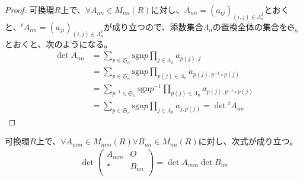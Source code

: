 \documentclass[dvipdfmx]{jsarticle}
\begin{document}
\begin{proof}
可換環$R$上で、$\forall A_{nn} \in M_{nn}(R)$に対し、$A_{nn} = \left( a_{ij} \right)_{(i,j) \in \varLambda_{n}^{2}}$とおくと、$^{t}A_{nn} = \left( a_{ji} \right)_{(i,j) \in \varLambda_{n}^{2}}$が成り立つので、添数集合$\varLambda_{n}$の置換全体の集合を$\mathfrak{S}_{n}$とおくと、次のようになる。
\begin{align*}
\det A_{nn} &= \sum_{p \in \mathfrak{S}_{n}} {{\mathrm{sgn} }p\prod_{j \in \varLambda_{n}} a_{p(j),j}}\\
&= \sum_{p \in \mathfrak{S}_{n}} {{\mathrm{sgn} }p\prod_{p(j) \in \varLambda_{n}} a_{p(j),p^{- 1} \circ p(j)}}\\
&= \sum_{p^{- 1} \in \mathfrak{S}_{n}} {{\mathrm{sgn} }p^{- 1}\prod_{p(j) \in \varLambda_{n}} a_{p(j),p^{- 1} \circ p(j)}}\\
&= \sum_{p \in \mathfrak{S}_{n}} {{\mathrm{sgn} }p\prod_{j \in \varLambda_{n}} a_{j,p(j)}} = \det{^{t}A_{nn}}
\end{align*}
\end{proof}
\begin{thm}\label{2.1.11.10}
可換環$R$上で、$\forall A_{mm} \in M_{mm}(R)\forall B_{nn} \in M_{nn}(R)$に対し、次式が成り立つ。
\begin{align*}
\det\begin{pmatrix}
A_{mm} & O \\
* & B_{nn} \\
\end{pmatrix} = \det A_{mm}\det B_{nn}
\end{align*}
\end{thm}
\end{document}
